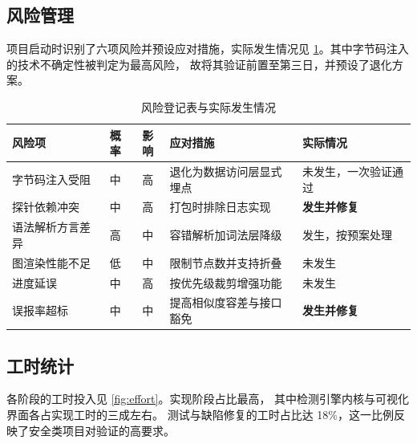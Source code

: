 \subsection{风险管理}

项目启动时识别了六项风险并预设应对措施，实际发生情况见
\cref{tab:risk-register}。其中字节码注入的技术不确定性被判定为最高风险，
故将其验证前置至第三日，并预设了退化方案。

\begin{table}[htbp]
\centering
\caption{风险登记表与实际发生情况}
\label{tab:risk-register}
\footnotesize
\begin{tabular}{@{}l c c p{3.6cm} l@{}}
\toprule
\textbf{风险项} & \textbf{概率} & \textbf{影响} & \textbf{应对措施} & \textbf{实际情况} \\
\midrule
字节码注入受阻     & 中 & 高 & 退化为数据访问层显式埋点 & 未发生，一次验证通过 \\
探针依赖冲突       & 中 & 高 & 打包时排除日志实现       & \textbf{发生并修复} \\
语法解析方言差异   & 高 & 中 & 容错解析加词法层降级     & 发生，按预案处理 \\
图渲染性能不足     & 低 & 中 & 限制节点数并支持折叠     & 未发生 \\
进度延误           & 中 & 高 & 按优先级裁剪增强功能     & 未发生 \\
误报率超标         & 中 & 中 & 提高相似度容差与接口豁免 & \textbf{发生并修复} \\
\bottomrule
\end{tabular}
\end{table}

\subsection{工时统计}

各阶段的工时投入见 \cref{fig:effort}。实现阶段占比最高，
其中检测引擎内核与可视化界面各占实现工时的三成左右。
测试与缺陷修复的工时占比达 18\%，这一比例反映了安全类项目对验证的高要求。

